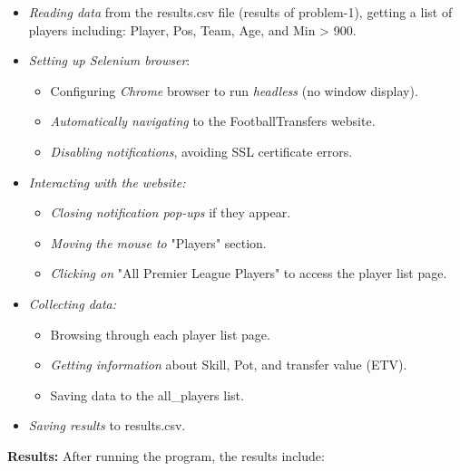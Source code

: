 \documentclass[12pt]{article}
\begin{document}
\begin{itemize}
    \item \textit{Reading data} from the results.csv file (results of problem-1), getting a list of players including: Player, Pos, Team, Age, and Min > 900.
    \item \textit{Setting up Selenium browser}:
    
    \begin{itemize}
        \item Configuring \textit{Chrome} browser to run \textit{headless} (no window display).
        \item \textit{Automatically navigating} to the FootballTransfers website.
        \item \textit{Disabling notifications}, avoiding SSL certificate errors.
    \end{itemize}
    
    \item \textit{Interacting with the website:}
    
    \begin{itemize}
        \item \textit{Closing notification pop-ups} if they appear.
        \item \textit{Moving the mouse to} "Players" section.
        \item \textit{Clicking on} "All Premier League Players" to access the player list page.
    \end{itemize}
    
    \item \textit{Collecting data:}
    
    \begin{itemize}
        \item Browsing through each player list page.
        \item \textit{Getting information} about Skill, Pot, and transfer value (ETV).
        \item Saving data to the all\_players list.
    \end{itemize}
    
    \item \textit{Saving results} to results.csv.
\end{itemize}

\textbf{Results:} After running the program, the results include:
\end{document}
